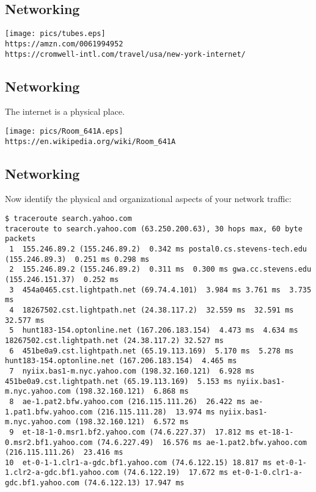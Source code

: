 \documentclass[xga]{xdvislides}
\begin{document}
\subsection{Networking}
\begin{center}
\vspace*{\fill}
	\texttt{[image: pics/tubes.eps]} \\
\vspace*{\fill}
{\tt https://amzn.com/0061994952} \\
{\tt https://cromwell-intl.com/travel/usa/new-york-internet/}
\end{center}

\subsection{Networking}
The internet is a physical place. \\
\begin{center}
\vspace*{\fill}
	\texttt{[image: pics/Room\_641A.eps]} \\
\vspace*{\fill}
{\tt https://en.wikipedia.org/wiki/Room\_641A}
\end{center}

\subsection{Networking}
Now identify the physical and organizational aspects
of your network traffic:

\begin{verbatim}
$ traceroute search.yahoo.com
traceroute to search.yahoo.com (63.250.200.63), 30 hops max, 60 byte packets
 1  155.246.89.2 (155.246.89.2)  0.342 ms postal0.cs.stevens-tech.edu (155.246.89.3)  0.251 ms 0.298 ms
 2  155.246.89.2 (155.246.89.2)  0.311 ms  0.300 ms gwa.cc.stevens.edu (155.246.151.37)  0.252 ms
 3  454a0465.cst.lightpath.net (69.74.4.101)  3.984 ms 3.761 ms  3.735 ms
 4  18267502.cst.lightpath.net (24.38.117.2)  32.559 ms  32.591 ms  32.577 ms
 5  hunt183-154.optonline.net (167.206.183.154)  4.473 ms  4.634 ms 18267502.cst.lightpath.net (24.38.117.2) 32.527 ms
 6  451be0a9.cst.lightpath.net (65.19.113.169)  5.170 ms  5.278 ms hunt183-154.optonline.net (167.206.183.154)  4.465 ms
 7  nyiix.bas1-m.nyc.yahoo.com (198.32.160.121)  6.928 ms 451be0a9.cst.lightpath.net (65.19.113.169)  5.153 ms nyiix.bas1-m.nyc.yahoo.com (198.32.160.121)  6.868 ms
 8  ae-1.pat2.bfw.yahoo.com (216.115.111.26)  26.422 ms ae-1.pat1.bfw.yahoo.com (216.115.111.28)  13.974 ms nyiix.bas1-m.nyc.yahoo.com (198.32.160.121)  6.572 ms
 9  et-18-1-0.msr1.bf2.yahoo.com (74.6.227.37)  17.812 ms et-18-1-0.msr2.bf1.yahoo.com (74.6.227.49)  16.576 ms ae-1.pat2.bfw.yahoo.com (216.115.111.26)  23.416 ms
10  et-0-1-1.clr1-a-gdc.bf1.yahoo.com (74.6.122.15) 18.817 ms et-0-1-1.clr2-a-gdc.bf1.yahoo.com (74.6.122.19)  17.672 ms et-0-1-0.clr1-a-gdc.bf1.yahoo.com (74.6.122.13) 17.947 ms
\end{verbatim}
\end{document}
